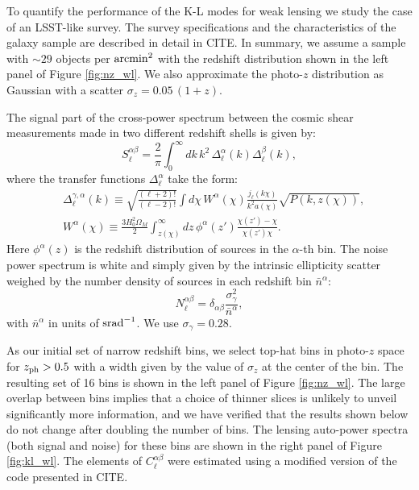 \documentclass[twocolumn,amsfont,amssymb,amsmath, showpacs,balancelastpage, nofootinbib]{revtex4-1}
\begin{document}
    To quantify the performance of the K-L modes for weak lensing we study the case of an LSST-like survey. The survey specifications and the characteristics of the galaxy sample are described in detail in CITE. In summary, we assume a sample with $\sim29$ objects per ${\rm arcmin}^2$ with the redshift distribution shown in the left panel of Figure \ref{fig:nz_wl}. We also approximate the photo-$z$ distribution as Gaussian with a scatter $\sigma_z=0.05\,(1+z)$.    
    
    The signal part of the cross-power spectrum between the cosmic shear measurements made in two different redshift shells is given by:
    \begin{equation}\label{eq:cl_generic}
      S^{\alpha\beta}_\ell=\frac{2}{\pi}\int_0^\infty dk\,k^2\,\Delta^\alpha_\ell(k)\Delta^\beta_\ell(k),
    \end{equation}
    where the transfer functions $\Delta^{\alpha}_\ell$ take the form:
    \begin{align}\nonumber
      &\Delta^{\gamma,\alpha}_\ell(k)\equiv\sqrt{\frac{(\ell+2)!}{(\ell-2)!}}\int d\chi\,W^\alpha(\chi)\frac{j_\ell(k\chi)}{k^2a(\chi)}\sqrt{P(k,z(\chi))},\\%
      &W^\alpha(\chi)\equiv\frac{3H_0^2\Omega_M}{2}\int_{z(\chi)}^\infty dz\,\phi^\alpha(z')\frac{\chi(z')-\chi}{\chi(z')\chi}.
    \end{align}
    Here $\phi^\alpha(z)$ is the redshift distribution of sources in the $\alpha$-th bin. The noise power spectrum is white and simply given by the intrinsic ellipticity scatter weighed by the number density of sources in each redshift bin $\bar{n}^\alpha$:
    \begin{equation}
      N^{\alpha\beta}_\ell=\delta_{\alpha\beta}\frac{\sigma_\gamma^2}{\bar{n}^\alpha},
    \end{equation}
    with $\bar{n}^\alpha$ in units of ${\rm srad}^{-1}$. We use $\sigma_\gamma=0.28$.
    
    As our initial set of narrow redshift bins, we select top-hat bins in photo-$z$ space for $z_{\rm ph}>0.5$ with a width given by the value of $\sigma_z$ at the center of the bin. The resulting set of 16 bins is shown in the left panel of Figure \ref{fig:nz_wl}. The large overlap between bins implies that a choice of thinner slices is unlikely to unveil significantly more information, and we have verified that the results shown below do not change after doubling the number of bins. The lensing auto-power spectra (both signal and noise) for these bins are shown in the right panel of Figure \ref{fig:kl_wl}. The elements of $C^{\alpha\beta}_\ell$ were estimated using a modified version of the code presented in CITE.
    
\end{document}

